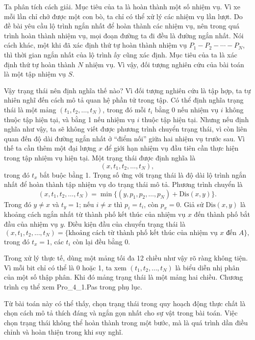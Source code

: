 \documentclass[11pt]{article}
\begin{document}
Ta phân tích cách giải. Mục tiêu của ta là hoàn thành một số nhiệm vụ. Vì xe
mỗi lần chỉ chở được một con bò, ta chỉ có thể xử lý các nhiệm vụ lần lượt.
Do đề bài yêu cầu lộ trình ngắn nhất để hoàn thành các nhiệm vụ, nên trong
quá trình hoàn thành nhiệm vụ, mọi đoạn đường ta đi đều là đường ngắn nhất.
Nói cách khác, một khi đã xác định thứ tự hoàn thành nhiệm vụ
\(P_1-P_2-\cdots-P_N\), thì thời gian ngắn nhất của lộ trình ấy cũng xác định.
Mục tiêu của ta là xác định thứ tự hoàn thành \(N\) nhiệm vụ. Vì vậy, đối
tượng nghiên cứu của bài toán là một tập nhiệm vụ \(S\).

Vậy trạng thái nên định nghĩa thế nào? Vì đối tượng nghiên cứu là tập hợp, ta
tự nhiên nghĩ đến cách mô tả quan hệ phần tử trong tập. Có thể định nghĩa
trạng thái là một mảng \((t_1,t_2,\ldots,t_N)\), trong đó mỗi \(t_i\) bằng 0
nếu nhiệm vụ \(i\) không thuộc tập hiện tại, và bằng 1 nếu nhiệm vụ \(i\)
thuộc tập hiện tại. Nhưng nếu định nghĩa như vậy, ta sẽ không viết được
phương trình chuyển trạng thái, vì còn liên quan đến độ dài đường ngắn nhất ở
``điểm nối'' giữa hai nhiệm vụ trước sau. Vì thế ta cần thêm một đại lượng
\(x\) để giới hạn nhiệm vụ đầu tiên cần thực hiện trong tập nhiệm vụ hiện tại.
Một trạng thái được định nghĩa là
\[
  (x,t_1,t_2,\ldots,t_N),
\]
trong đó \(t_x\) bắt buộc bằng 1. Trọng số ứng với trạng thái là độ dài lộ
trình ngắn nhất để hoàn thành tập nhiệm vụ do trạng thái mô tả. Phương trình
chuyển là
\[
  (x,t_1,t_2,\ldots,t_N)
  = \min \{(y,p_1,p_2,\ldots,p_N)+\mathrm{Dis}(x,y)\}.
\]
Trong đó \(y\ne x\) và \(t_y=1\); nếu \(i\ne x\) thì \(p_i=t_i\), còn
\(p_x=0\). Giả sử \(\mathrm{Dis}(x,y)\) là khoảng cách ngắn nhất từ thành phố
kết thúc của nhiệm vụ \(x\) đến thành phố bắt đầu của nhiệm vụ \(y\). Điều
kiện đầu của chuyển trạng thái là
\[
  (x,t_1,t_2,\ldots,t_N)
  = \{\text{khoảng cách từ thành phố kết thúc của nhiệm vụ }x\text{ đến }A\},
\]
trong đó \(t_x=1\), các \(t_i\) còn lại đều bằng 0.

Trong xử lý thực tế, dùng một mảng tối đa 12 chiều như vậy rõ ràng không tiện.
Vì mỗi bit chỉ có thể là 0 hoặc 1, ta xem \((t_1,t_2,\ldots,t_N)\) là biểu
diễn nhị phân của một số thập phân. Khi đó mảng trạng thái là một mảng hai
chiều. Chương trình cụ thể xem Pro\_4\_1.Pas trong phụ lục.

Từ bài toán này có thể thấy, chọn trạng thái trong quy hoạch động thực chất
là chọn cách mô tả thích đáng và ngắn gọn nhất cho sự vật trong bài toán.
Việc chọn trạng thái không thể hoàn thành trong một bước, mà là quá trình dần
điều chỉnh và hoàn thiện trong khi suy nghĩ.
\end{document}

